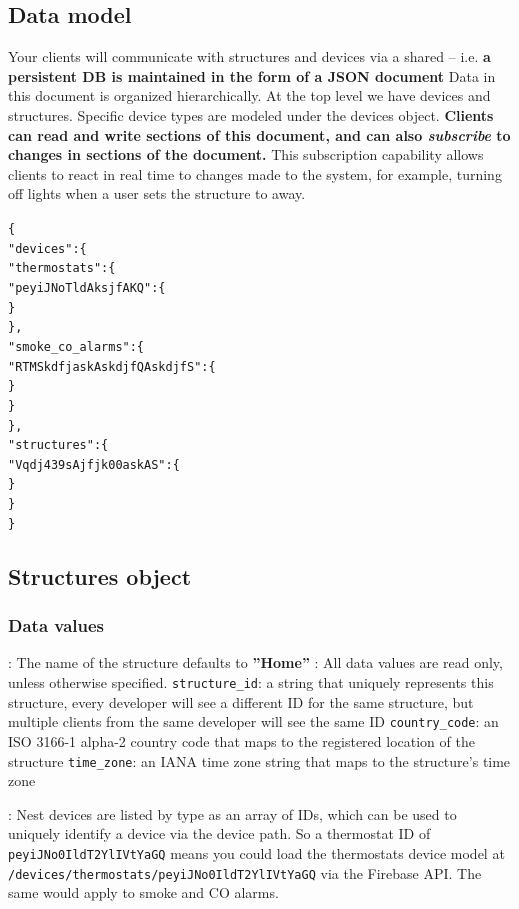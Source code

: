 \documentclass{myproc}
\begin{document}
\subsection{Data model}
\bit
\w Your clients will communicate with structures and devices via a shared
 -- i.e. \textcolor{red2}{\bf{}a persistent DB is maintained in the form
     of a JSON document}
\w Data in this document is organized hierarchically. At the top level we have
devices and structures. Specific device types are modeled under the devices
object. 
\w \textcolor{red2}{\bf{}Clients can read and write sections of this document, and
  can also {\em subscribe} to changes in sections of the document.} 
    \bit
    \w This subscription capability allows clients to react in real time to
    changes made to the system, for example, turning off lights when a user
    sets the structure to away. 
    \eit
\begin{alltt}
  \{
    "devices": \{
      "thermostats": \{
        "peyiJNoTldAksjfAKQ": \{
        \}
      \},
      "smoke_co_alarms": \{
        "RTMSkdfjaskAskdjfQAskdjfS": \{
        \}
      \}
    \},
    "structures": \{
        "Vqdj439sAjfjk00askAS": \{
        \}
    \}
  \}
\end{alltt}
\eit

\subsection{Structures object}
\subsubsection{Data values}
\bit
\w {}: The name of the structure defaults to \textcolor{red2}{\bf{}''Home''}
\w {}:  All data values are read only, unless otherwise specified.
   \bit
   \w \textcolor{red2}{\texttt{structure\_id}}: a string that uniquely represents this structure, every developer will see a different ID for the same structure, but multiple clients from the same developer will see the same ID
   \w \textcolor{red2}{\texttt{country\_code}}: an ISO 3166-1 alpha-2 country code that maps to the registered location of the structure
   \w \textcolor{red2}{\texttt{time\_zone}}:  an IANA time zone string that
   maps to the structure's time zone
   \eit

\w {}: Nest devices are listed by type as an array of IDs, which can
be used to uniquely identify a device via the device path. So a thermostat ID
of \textcolor{red2}{\texttt{peyiJNo0IldT2YlIVtYaGQ}} means you could load the thermostats device model at
\textcolor{red2}{\texttt{/devices/thermostats/peyiJNo0IldT2YlIVtYaGQ}} via the Firebase API. The same
would apply to smoke and CO alarms.
\end{document}
